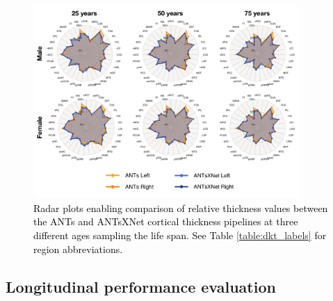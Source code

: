 \documentclass[
  12pt,
]{article}
\begin{document}
\begin{figure}[htb]
  \centering
    \includegraphics[width=0.9\textwidth]{Figures/radarSPRB.pdf}
  \caption{\textcolor{black}{Radar plots enabling comparison of relative thickness values between
  the ANTs and ANTsXNet cortical thickness pipelines at three different ages
  sampling the life span.  See Table \ref{table:dkt_labels} for region abbreviations. }}
  \label{fig:radar}
\end{figure}

\hypertarget{longitudinal-performance-evaluation}{%
\subsection*{Longitudinal performance
evaluation}\label{longitudinal-performance-evaluation}}
\end{document}
